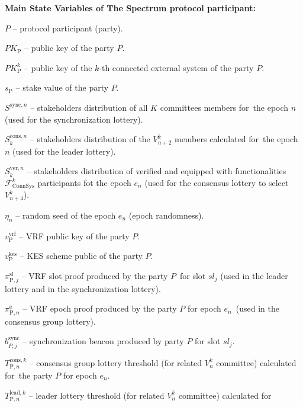\noindent
\textbf{Main State Variables of The Spectrum protocol participant:}
\begin{legal}
    \item[\ding{113}] $P$ -- protocol participant (party).
    \item[\ding{113}] $PK_{\text{P}}$ -- public key of the party $P$.
    \item[\ding{113}] $PK^k_{\text{P}}$ -- public key of the $k$-th connected external system of the party $P$.
    \item[\ding{113}] $s_{\text{P}}$ -- stake value of the party $P$.
    \item[\ding{113}] $S^{\text{sync}, n}$ -- stakeholders distribution of all $K$ committees members for\
    the epoch $n$ (used for the synchronization lottery).
    \item[\ding{113}] $S_k^{\text{cons}, n}$ -- stakeholders distribution of the $V^k_{n + 2}$ members calculated for\
    the epoch $n$ (used for the leader lottery).
    \item[\ding{113}] $S_k^{\text{ver}, n}$ -- stakeholders distribution of verified and equipped with functionalities\
    $\mathcal{F}^k_{\text{ConnSys}}$ participants fot the epoch $e_n$ (used for the consensus lottery to select $V^k_{n + 4}$).
    \item[\ding{113}] $\eta_n$ -- random seed of the epoch $e_n$ (epoch randomness).
    \item[\ding{113}] $v^{\text{vrf}}_{\text{P}}$ -- VRF public key of the party $P$.
    \item[\ding{113}] $v^{\text{kes}}_{\text{P}}$ -- KES scheme public of the party $P$.
    \item[\ding{113}] $\pi^{\text{sl}}_{\text{P}, j}$ -- VRF slot proof produced by the party $P$\
    for slot $sl_j$ (used in the leader lottery and in the synchronization lottery).
    \item[\ding{113}] $\pi^{\text{e}}_{\text{P}, n}$ -- VRF epoch proof produced by the party $P$ for epoch $e_n$\
    (used in the consensus group lottery).
    \item[\ding{113}] $b^{\text{sync}}_{P, j}$ -- synchronization beacon produced by party $P$ for slot $sl_j$.
    \item[\ding{113}] $T^{\text{cons}, k}_{\text{P}, n}$ -- consensus group lottery threshold (for related  $V^k_n$ committee) calculated for\
    the party $P$ for epoch $e_n$.
    \item[\ding{113}] $T^{\text{lead}, k}_{\text{P}, n}$ -- leader lottery threshold (for related $V^k_n$ committee) calculated for\

\end{legal}
